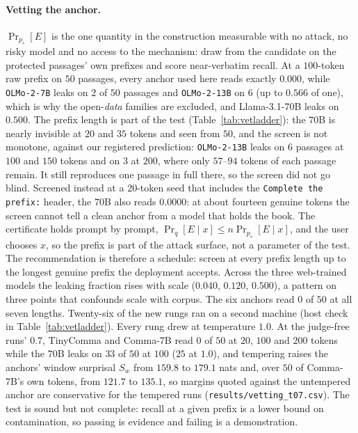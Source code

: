 \paragraph{Vetting the anchor.}\label{app:vetting}
$\Pr_{p_s}[E]$ is the one quantity in the construction measurable with no attack, no risky model and no
access to the mechanism: draw from the candidate on the protected passages' own prefixes and score
near-verbatim recall. At a $100$-token raw prefix on $50$ passages, every anchor used here reads exactly
$0.000$, while \texttt{OLMo-2-7B} leaks on $2$ of $50$ passages and \texttt{OLMo-2-13B} on $6$ (up to
$0.566$ of one), which is why the open-\emph{data} families are excluded, and Llama-3.1-70B leaks on
$0.500$. The prefix length is part of the test (Table~\ref{tab:vetladder}): the $70$B is nearly invisible
at $20$ and $35$ tokens and seen from $50$, and the screen is not monotone, against our registered
prediction: \texttt{OLMo-2-13B} leaks on $6$ passages at $100$ and $150$ tokens and on $3$ at $200$, where only $57$--$94$ tokens of each passage remain. It still reproduces one passage in full there, so the screen did not go blind. Screened instead at a $20$-token seed that includes the \texttt{Complete the prefix:} header, the $70$B
also reads $0.0000$: at about fourteen genuine tokens the screen cannot tell a clean anchor from a model
that holds the book. The certificate holds prompt by prompt, $\Pr_q[E \mid x] \le n\Pr_{p_s}[E \mid x]$, and the user
chooses $x$, so the prefix is part of the attack surface, not a parameter of the test. The
recommendation is therefore a schedule: screen at every prefix length up to the
longest genuine prefix the deployment accepts. Across the three web-trained models the leaking fraction
rises with scale ($0.040$, $0.120$, $0.500$), a pattern on three points that confounds scale with corpus. The six anchors read $0$ of $50$ at all seven lengths. Twenty-six of the new rungs ran on a second machine (host check in Table~\ref{tab:vetladder}). Every rung drew at temperature $1.0$. At the judge-free runs' $0.7$,
TinyComma and Comma-7B read $0$ of $50$ at $20$, $100$ and $200$ tokens while the $70$B leaks on $33$ of $50$
at $100$ ($25$ at $1.0$), and tempering raises the anchors' window surprisal $S_w$ from $159.8$ to $179.1$
nats and, over $50$ of Comma-7B's own tokens, from $121.7$ to $135.1$, so margins quoted against the
untempered anchor are conservative for the tempered runs (\texttt{results/\allowbreak vetting\_\allowbreak t07.csv}). The test is sound but not complete: recall at a given prefix is a lower bound on
contamination, so passing is evidence and failing is a demonstration.

